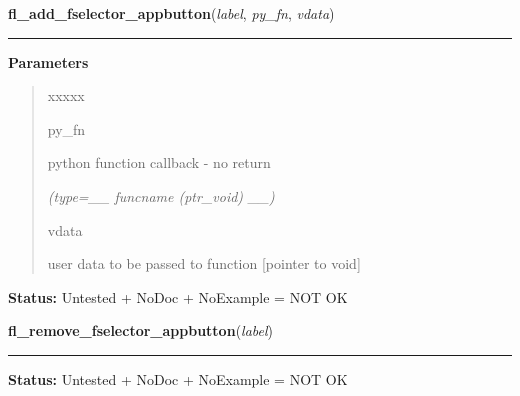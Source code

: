     \vspace{0.5ex}

\hspace{.8\funcindent}\begin{boxedminipage}{\funcwidth}

    \raggedright \textbf{fl\_add\_fselector\_appbutton}(\textit{label}, \textit{py\_fn}, \textit{vdata})

    \vspace{-1.5ex}

    \rule{\textwidth}{0.5\fboxrule}
\setlength{\parskip}{2ex}
\setlength{\parskip}{1ex}
      \textbf{Parameters}
      \vspace{-1ex}

      \begin{quote}
        \begin{Ventry}{xxxxx}

          \item[py\_fn]

          python function callback - no return

            {\it (type=\_\_ funcname (ptr\_void) \_\_)}

          \item[vdata]

          user data to be passed to function [pointer to void]

        \end{Ventry}

      \end{quote}

\textbf{Status:} Untested + NoDoc + NoExample = NOT OK



    \end{boxedminipage}

    \label{xformslib:library:fl_remove_fselector_appbutton}

    \vspace{0.5ex}

\hspace{.8\funcindent}\begin{boxedminipage}{\funcwidth}

    \raggedright \textbf{fl\_remove\_fselector\_appbutton}(\textit{label})

    \vspace{-1.5ex}

    \rule{\textwidth}{0.5\fboxrule}
\setlength{\parskip}{2ex}
\setlength{\parskip}{1ex}
\textbf{Status:} Untested + NoDoc + NoExample = NOT OK



    \end{boxedminipage}

